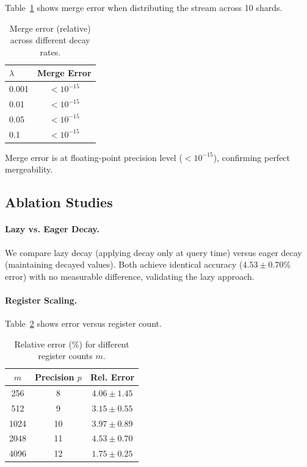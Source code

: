 \documentclass{article}
\begin{document}
Table~\ref{tab:mergeability} shows merge error when distributing the stream across 10 shards.

\begin{table}[t]
\caption{Merge error (relative) across different decay rates.}
\label{tab:mergeability}
\centering
\begin{tabular}{lc}
\toprule
$\lambda$ & Merge Error \\
\midrule
0.001 & $< 10^{-15}$ \\
0.01 & $< 10^{-15}$ \\
0.05 & $< 10^{-15}$ \\
0.1 & $< 10^{-15}$ \\
\bottomrule
\end{tabular}
\end{table}

Merge error is at floating-point precision level ($<10^{-15}$), confirming perfect mergeability.

\subsection{Ablation Studies}

\paragraph{Lazy vs. Eager Decay.}
We compare lazy decay (applying decay only at query time) versus eager decay (maintaining decayed values). Both achieve identical accuracy ($4.53\pm0.70\%$ error) with no measurable difference, validating the lazy approach.

\paragraph{Register Scaling.}
Table~\ref{tab:scaling} shows error versus register count.

\begin{table}[t]
\caption{Relative error (\%) for different register counts $m$.}
\label{tab:scaling}
\centering
\begin{tabular}{ccc}
\toprule
$m$ & Precision $p$ & Rel. Error \\
\midrule
256 & 8 & $4.06 \pm 1.45$ \\
512 & 9 & $3.15 \pm 0.55$ \\
1024 & 10 & $3.97 \pm 0.89$ \\
2048 & 11 & $4.53 \pm 0.70$ \\
4096 & 12 & $1.75 \pm 0.25$ \\
\bottomrule
\end{tabular}
\end{table}
\end{document}
